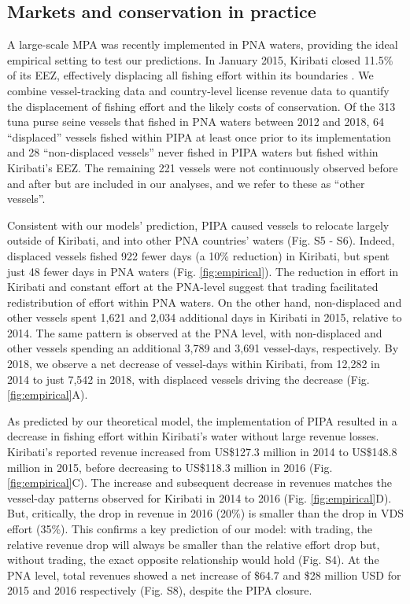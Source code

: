 \documentclass[12pt]{article}
\begin{document}
\subsection{Markets and conservation in practice}

A large-scale MPA was recently implemented in PNA waters, providing the ideal empirical setting to test our predictions. In January 2015, Kiribati closed 11.5\% of its EEZ, effectively displacing all fishing effort within its boundaries \cite{mccauley_2016,mcdermott_2018}. We combine vessel-tracking data \cite{kroodsma_2018} and country-level license revenue data \cite{ffa_2017} to quantify the displacement of fishing effort and the likely costs of conservation. Of the 313 tuna purse seine vessels that fished in PNA waters between 2012 and 2018, 64 ``displaced'' vessels fished within PIPA at least once prior to its implementation and 28 ``non-displaced vessels'' never fished in PIPA waters but fished within Kiribati's EEZ. The remaining 221 vessels were not continuously observed before and after but are included in our analyses, and we refer to these as ``other vessels''.

Consistent with our models' prediction, PIPA caused vessels to relocate largely outside of Kiribati, and into other PNA countries' waters (Fig. S5 - S6). Indeed, displaced vessels fished 922 fewer days (a 10\% reduction) in Kiribati, but spent just 48 fewer days in PNA waters (Fig. \ref{fig:empirical}).  The reduction in effort in Kiribati and constant effort at the PNA-level suggest that trading facilitated redistribution of effort within PNA waters. On the other hand, non-displaced and other vessels spent 1,621 and 2,034 additional days in Kiribati in 2015, relative to 2014. The same pattern is observed at the PNA level, with non-displaced and other vessels spending an additional 3,789 and 3,691 vessel-days, respectively. By 2018, we observe a net decrease of vessel-days within Kiribati, from 12,282 in 2014 to just 7,542 in 2018, with displaced vessels driving the decrease (Fig. \ref{fig:empirical}A).

As predicted by our theoretical model, the implementation of PIPA resulted in a decrease in fishing effort within Kiribati's water without large revenue losses. Kiribati's reported revenue increased from US\$127.3 million in 2014 to US\$148.8 million in 2015, before decreasing to US\$118.3 million in 2016 (Fig. \ref{fig:empirical}C). The increase and subsequent decrease in revenues matches the vessel-day patterns observed for Kiribati in 2014 to 2016 (Fig. \ref{fig:empirical}D). But, critically, the drop in revenue in 2016 (20\%) is smaller than the drop in VDS effort (35\%). This confirms a key prediction of our model: with trading, the relative revenue drop will always be smaller than the relative effort drop but, without trading, the exact opposite relationship would hold (Fig. S4). At the PNA level, total revenues showed a net increase of \$64.7 and \$28 million USD for 2015 and 2016 respectively (Fig. S8), despite the PIPA closure.
\end{document}
